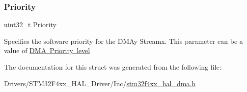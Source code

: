 \subsubsection{\texorpdfstring{Priority}{Priority}}
{\footnotesize\ttfamily uint32\+\_\+t Priority}

Specifies the software priority for the D\+M\+Ay Streamx. This parameter can be a value of \mbox{\hyperlink{group___d_m_a___priority__level}{D\+MA Priority level}} 

The documentation for this struct was generated from the following file\+:\begin{DoxyCompactItemize}
\item 
Drivers/\+S\+T\+M32\+F4xx\+\_\+\+H\+A\+L\+\_\+\+Driver/\+Inc/\mbox{\hyperlink{stm32f4xx__hal__dma_8h}{stm32f4xx\+\_\+hal\+\_\+dma.\+h}}\end{DoxyCompactItemize}
